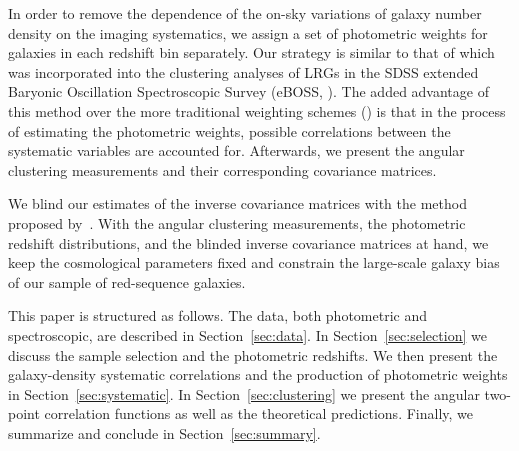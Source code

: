 \documentclass{aa}
\numberwithin{equation}{section}
\begin{document}
{In order to remove the dependence of the on-sky variations of galaxy number density on the imaging systematics, we assign a set of photometric weights for galaxies in each redshift bin separately. Our strategy is similar to that of \citet{bautista2018sdss, icaza2020clustering} which was incorporated into the clustering analyses of LRGs in the SDSS extended Baryonic Oscillation Spectroscopic Survey (eBOSS, \citealt{dawson2016}). The added advantage of this method over the more traditional weighting schemes (\citealt{ross2017clustering, crocce2019dark}) is that in the process of estimating the photometric weights, possible correlations between the systematic variables are accounted for. Afterwards, we present the angular clustering measurements and their corresponding covariance matrices.

We blind our estimates of the inverse covariance matrices with the method proposed by~\citet{sellentin2019}. With the angular clustering measurements, the photometric redshift distributions, and the blinded inverse covariance matrices at hand, we keep the cosmological parameters fixed and constrain the large-scale galaxy bias of our sample of red-sequence galaxies. 


This paper is structured as follows. The data, both photometric and spectroscopic, are described in Section~\ref{sec:data}. In Section~\ref{sec:selection} we discuss the sample selection and the photometric redshifts. We then present the galaxy-density systematic correlations and the production of photometric weights in Section~\ref{sec:systematic}. In Section~\ref{sec:clustering} we present the angular two-point correlation functions as well as the theoretical predictions. Finally, we summarize and conclude in Section~\ref{sec:summary}. 

}
\end{document}
